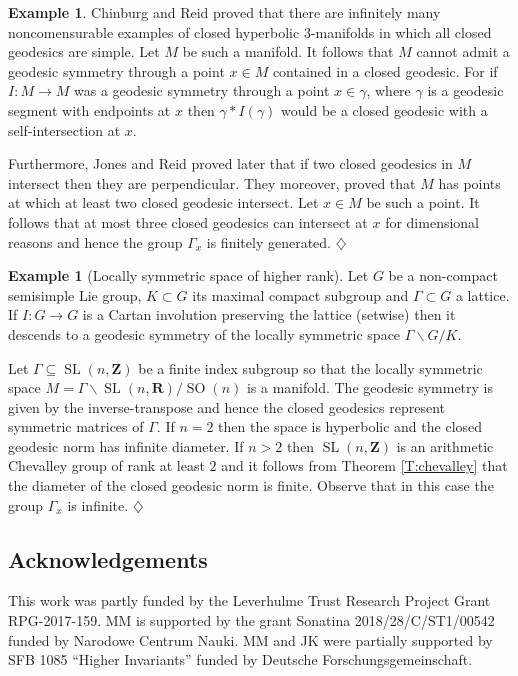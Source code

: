 \documentclass[12pt]{amsart}
\newcommand{\B}[1]{{\mathbf #1}}
\theoremstyle{definition}
\newtheorem{example}[subsection]{Example}
\theoremstyle{remark}
\numberwithin{figure}{section}
\numberwithin{table}{section}
\numberwithin{equation}{section}
\newcommand{\OP}{\operatorname}
\begin{document}
\begin{example}\label{E:reid}
Chinburg and Reid \cite{MR1243786} proved that there are infinitely many
noncomensurable examples of closed hyperbolic $3$-manifolds in which all
closed geodesics are simple. Let $M$ be such a manifold. 
It follows that $M$ cannot admit a geodesic symmetry through a point
$x\in M$ contained in a closed geodesic. For if $I\colon M\to M$
was a geodesic symmetry through a point $x\in \gamma$, where $\gamma$
is a geodesic segment with endpoints at $x$ then $\gamma*I(\gamma)$ would
be a closed geodesic with a self-intersection at $x$. 

Furthermore, Jones and Reid \cite{MR1458971} proved later that if two closed
geodesics in $M$ intersect then they are perpendicular. They moreover, proved
that $M$ has points at which at least two closed geodesic intersect. Let $x\in
M$ be such a point. It follows that at most three closed geodesics can
intersect at $x$ for dimensional reasons and hence the group $\Gamma_x$
is finitely generated.
\hfill $\diamondsuit$
\end{example}


\begin{example}[Locally symmetric space of higher rank]\label{E:locally-symmetric}
Let $G$ be a non-compact semisimple Lie group, $K\subset G$ its maximal
compact subgroup and $\Gamma\subset G$ a lattice. If $I\colon G\to G$
is a Cartan involution preserving the lattice (setwise) then
it descends to a geodesic symmetry of the locally symmetric
space $\Gamma\backslash G/K$. 

Let $\Gamma\subseteq \OP{SL}(n,\B Z)$ be a finite index subgroup
so that the locally symmetric space 
$M=\Gamma\backslash \OP{SL}(n,\B R)/\OP{SO}(n)$
is a manifold. The geodesic symmetry is given by the inverse-transpose
and hence the closed geodesics represent symmetric matrices
of $\Gamma$. If $n=2$ then the space is hyperbolic and
the closed geodesic norm has infinite diameter. If $n>2$ then
$\OP{SL}(n,\B Z)$ is an arithmetic Chevalley group of rank
at least $2$ and it follows from Theorem \ref{T:chevalley} that
the diameter of the closed geodesic norm is finite. Observe
that in this case the group $\Gamma_x$ is infinite.
\hfill $\diamondsuit$
\end{example}



\subsection*{Acknowledgements} This work was partly funded by the Leverhulme
Trust Research Project Grant RPG-2017-159. MM is supported by the grant
Sonatina 2018/28/C/ST1/00542 funded by Narodowe Centrum Nauki.
MM and JK were partially supported by SFB 1085 ``Higher Invariants''
funded by Deutsche Forschungsgemeinschaft.
\end{document}
